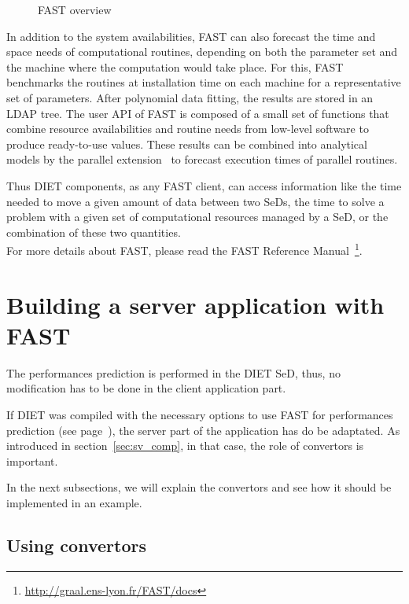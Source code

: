 \begin{figure}[htb]
  \begin{center}
    \caption{FAST overview}
    \label{fig:fast-overview}
  \end{center}
\end{figure}

In addition to the system availabilities, FAST can also forecast the
time and space needs of computational routines, depending on both the
parameter set and the machine where the computation would take place.
For this, FAST benchmarks the routines at installation time on each
machine for a representative set of parameters. After polynomial data
fitting, the results are stored in an LDAP tree.  The user API of FAST
is composed of a small set of functions that combine resource
availabilities and routine needs from low-level software to produce
ready-to-use values.  These results can be combined into analytical
models by the parallel extension~\cite{CS02} to forecast execution
times of parallel routines.

Thus DIET components, as any FAST client, can access information like
the time needed to move a given amount of data between two SeDs, the
time to solve a problem with a given set of computational resources
managed by a SeD, or the combination of these two quantities.\\

For more details about FAST, please read the FAST Reference
Manual~\footnote{\url{http://graal.ens-lyon.fr/FAST/docs}}.

\section{Building a server application with FAST}

The performances prediction is performed in the DIET SeD, thus, no
modification has to be done in the client application part.

If DIET was compiled  with the necessary options to use FAST for
performances prediction (see page~\pageref{fast_compil}), the server
part of the application has do be adaptated. As introduced in
section~\ref{sec:sv_comp}, in that case, the role of convertors is
important.

In the next subsections, we will explain the convertors and see how it
should be implemented in an example.

\subsection{Using convertors}

